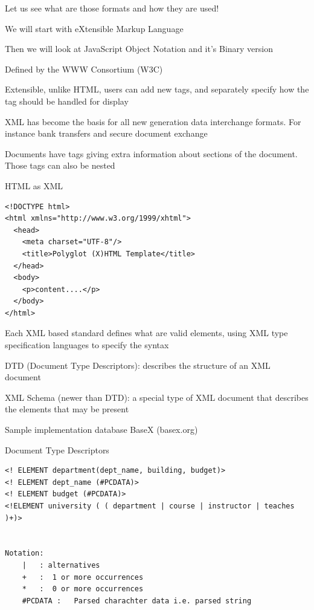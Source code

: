\documentclass{beamer}
\begin{document}
\begin{slide}{
\item Let us see what are those formats and how they are used!
\item We will start with eXtensible Markup Language 
\item Then we will look at JavaScript Object Notation and it's Binary version 
}\end{slide}

\begin{slide}{
\item Defined by the WWW Consortium (W3C)
\item Extensible, unlike HTML, users can add new tags, and separately specify how the tag should be handled for display	 
\item XML has become the basis for all new generation data interchange formats. For instance bank transfers and secure document exchange
\item Documents have tags giving extra information about sections of the document. Those tags can also be nested
}\end{slide}

\begin{frame}[fragile]{HTML as XML }
\begin{lstlisting}
<!DOCTYPE html>
<html xmlns="http://www.w3.org/1999/xhtml">
  <head>
    <meta charset="UTF-8"/>
    <title>Polyglot (X)HTML Template</title>
  </head>
  <body>
    <p>content....</p>
  </body>
</html>
\end{lstlisting}
\end{frame}

\begin{slide}{
\item Each XML based standard defines what are valid elements, using XML type specification languages to specify the syntax
\item DTD (Document Type Descriptors): describes the structure of an XML document
\item XML Schema (newer than DTD): a special type of XML document that describes the elements that may be present
\item Sample implementation database BaseX (basex.org)
}\end{slide}

\begin{frame}[fragile]{Document Type Descriptors}
\begin{lstlisting}
<! ELEMENT department(dept_name, building, budget)>
<! ELEMENT dept_name (#PCDATA)>
<! ELEMENT budget (#PCDATA)>
<!ELEMENT university ( ( department | course | instructor | teaches )+)>


Notation:
	|	: alternatives
	+	:  1 or more occurrences
	* 	:  0 or more occurrences
	#PCDATA	:	Parsed charachter data i.e. parsed string
\end{lstlisting}
\end{frame}
\end{document}
